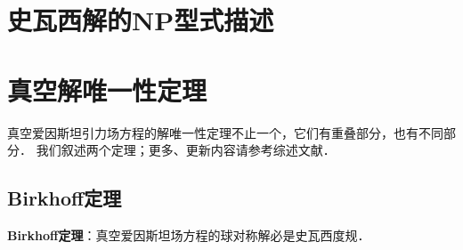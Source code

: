 \section{史瓦西解的NP型式描述}

\section{真空解唯一性定理}

真空爱因斯坦引力场方程的解唯一性定理不止一个，它们有重叠部分，也有不同部分．
我们叙述两个定理；更多、更新内容请参考综述文献\parencite{Chrusciel-2012-lrr}．

\subsection{Birkhoff定理}

{\bfseries \heiti Birkhoff定理}：真空爱因斯坦场方程的球对称解必是史瓦西度规．%

